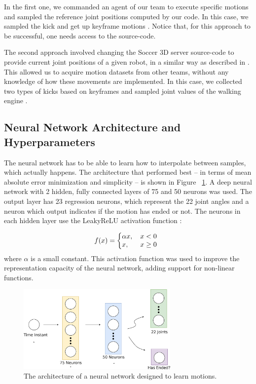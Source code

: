 In the first one, we commanded an agent of our team to execute specific motions and sampled the reference joint positions computed by our code. In this case, we sampled the kick and get up keyframe motions \cite{muniz2016}. Notice that, for this approach to be successful, one needs access to the source-code.

The second approach involved changing the Soccer 3D server source-code to provide current joint positions of a given robot, in a similar way as described in \cite{macalpine2013}. This allowed us to acquire motion datasets from other teams, without any knowledge of how these movements are implemented. In this case, we collected two types of kicks based on keyframes and sampled joint values of the walking engine \cite{AAAI12-MacAlpine}.


\subsection{Neural Network Architecture and Hyperparameters}

The neural network has to be able to learn how to interpolate between samples, which actually happens. The architecture that performed best -- in terms of mean absolute error minimization and simplicity -- is shown in Figure ~\ref{fig:model_plot}. A deep neural network with 2 hidden, fully connected layers of 75 and 50 neurons was used. The output layer has 23 regression neurons, which represent the 22 joint angles and a neuron which output indicates if the motion has ended or not. The neurons in each hidden layer use the LeakyReLU activation function \cite{leakyrelu}: 

\[
  f(x) = \left\{
     \begin{array}{@{}l@{\thinspace}l}
       \alpha x,   & \quad x < 0  \\
       x, & \quad x \ge0 \\
     \end{array}
   \right.
\]
where $\alpha$ is a small constant. This activation function was used to improve the representation capacity of the neural network, adding support for non-linear functions.

\begin{figure}[!htbp]
\centering
\includegraphics[width=0.7\textwidth]{Cap5/architecture}
\caption{The architecture of a neural network designed to learn motions.}
\label{fig:model_plot}
\end{figure}

